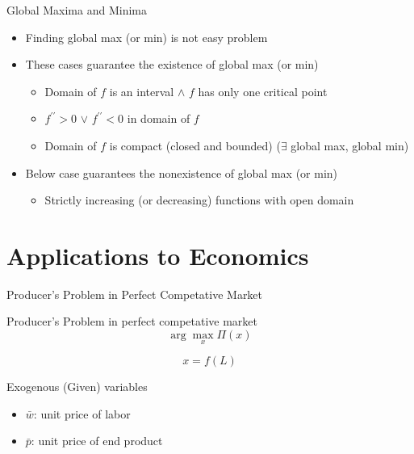 \documentclass[a4paper,11pt]{article}
\begin{document}
\begin{frame}[t]{Global Maxima and Minima}
	\begin{itemize}
		\item Finding global max (or min) is not easy problem
		\item These cases guarantee the existence of global max (or min)
		\begin{itemize}
			\item Domain of $f$ is an interval $\land$ $f$ has only one critical point
			\item $f^{\prime\prime}>0$ $\lor$ $f^{\prime\prime}<0$ in domain of $f$
			\item Domain of $f$ is compact (closed and bounded)    ($\exists$ global max, global min)
		\end{itemize}
		\item Below case guarantees the nonexistence of global max (or min)
		\begin{itemize}
			\item Strictly increasing (or decreasing) functions with open domain
		\end{itemize}
	\end{itemize}
\end{frame}

\section{Applications to Economics} %
\label{sec:applications_to_economics}
\begin{frame}[t]{Producer's Problem in Perfect Competative Market}
	
	\begin{block}
		{Producer's Problem in perfect competative market}
		\[
			\arg\max_x \Pi(x)
		\]
	\end{block}
	\[
		x=f(L) \tag{Production Function}
	\]
	\begin{block}
		{Exogenous (Given) variables}
		\begin{itemize}
			\item $\bar w$: unit price of labor
			\item $\bar p$: unit price of end product
		\end{itemize}
	\end{block}
\end{frame}
\end{document}
